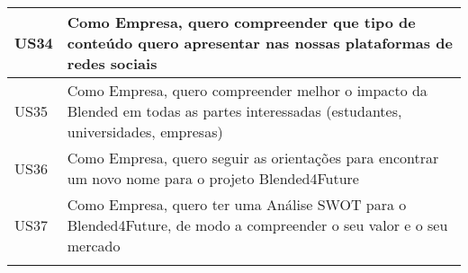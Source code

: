 \begin{landscape}
\begin{longtable}{lp{20cm}}
    US34 & Como Empresa, quero compreender que tipo de conteúdo quero apresentar nas nossas plataformas de redes sociais \\ \hline
    US35 & Como Empresa, quero compreender melhor o impacto da Blended em todas as partes interessadas (estudantes, universidades, empresas) \\ \hline
    US36 & Como Empresa, quero seguir as orientações para encontrar um novo nome para o projeto Blended4Future \\ \hline
    US37 & Como Empresa, quero ter uma Análise SWOT para o Blended4Future, de modo a compreender o seu valor e o seu mercado \\ \hline


\label{tab:req-funcionais}
\end{longtable}
\end{landscape}
